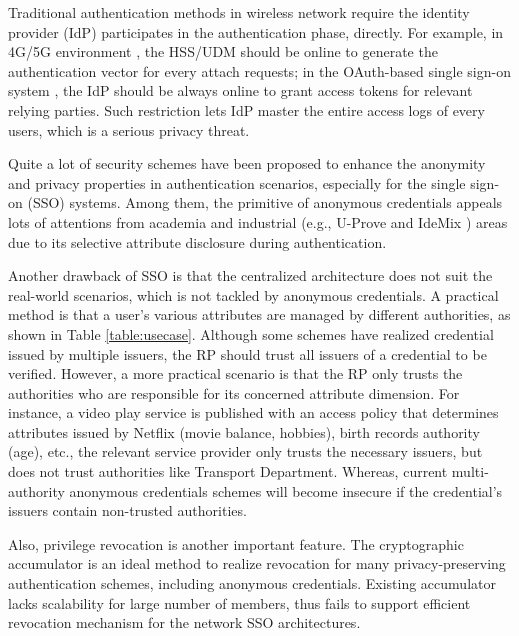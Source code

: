 \documentclass[journal]{IEEEtran}
\begin{document}
Traditional authentication methods in wireless network require the identity provider (IdP) participates in the authentication phase, directly. For example, in 4G/5G environment \cite{3gpp.33.102, 3gpp.33.401, 3gpp.33.501}, the HSS/UDM should be online to generate the authentication vector for every attach requests; in the OAuth-based single sign-on system \cite{rfc6749, recordon2006openid}, the IdP should be always online to grant access tokens for relevant relying parties. Such restriction lets IdP master the entire access logs of every users, which is a serious privacy threat. 

Quite a lot of security schemes have been proposed to enhance the anonymity and privacy properties in authentication scenarios, especially for the single sign-on (SSO) systems. Among them, the primitive of anonymous credentials \cite{camenisch2002design} appeals lots of attentions from academia and industrial (e.g., U-Prove \cite{paquin2011u} and IdeMix \cite{camenisch2004signature}) areas due to its selective attribute disclosure during authentication. %

Another drawback of SSO is that the centralized architecture does not suit the real-world scenarios, which is not tackled by anonymous credentials. A practical method is that a user's various attributes are managed by different authorities, as shown in Table \ref{table:usecase}. Although some schemes have realized credential issued by multiple issuers, the RP should trust all issuers of a credential to be verified. However, a more practical scenario is that the RP only trusts the authorities who are responsible for its concerned attribute dimension. For instance, a video play service is published with an access policy that determines attributes issued by Netflix (movie balance, hobbies), birth records authority (age), etc., the relevant service provider only trusts the necessary issuers, but does not trust authorities like Transport Department. Whereas, current multi-authority anonymous credentials schemes will become insecure if the credential's issuers contain non-trusted authorities. 

Also, privilege revocation is another important feature. The cryptographic accumulator \cite{RSAaccumulator, BPaccumulator} is an ideal method to realize revocation for many privacy-preserving authentication schemes, including anonymous credentials. Existing accumulator lacks scalability for large number of members, thus fails to support efficient revocation mechanism for the network SSO architectures. 
\end{document}
